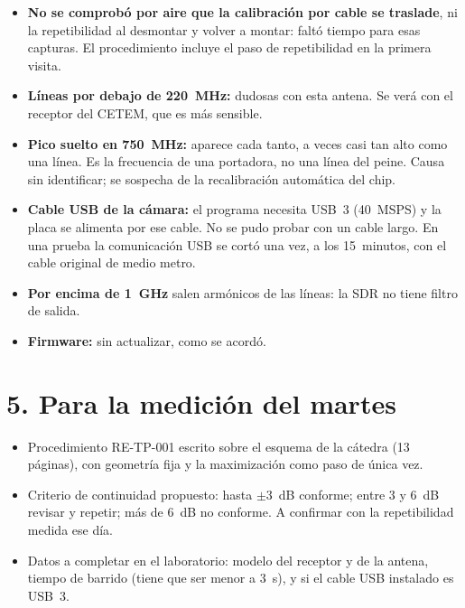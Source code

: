 \documentclass[11pt,a4paper]{article}
\begin{document}
\begin{itemize}
  \item \textbf{No se comprobó por aire que la calibración por cable se traslade}, ni la repetibilidad al desmontar y volver a montar: faltó tiempo para esas capturas. El procedimiento incluye el paso de repetibilidad en la primera visita.
  \item \textbf{Líneas por debajo de 220~MHz:} dudosas con esta antena. Se verá con el receptor del CETEM, que es más sensible.
  \item \textbf{Pico suelto en 750~MHz:} aparece cada tanto, a veces casi tan alto como una línea. Es la frecuencia de una portadora, no una línea del peine. Causa sin identificar; se sospecha de la recalibración automática del chip.
  \item \textbf{Cable USB de la cámara:} el programa necesita USB~3 (40~MSPS) y la placa se alimenta por ese cable. No se pudo probar con un cable largo. En una prueba la comunicación USB se cortó una vez, a los 15~minutos, con el cable original de medio metro.
  \item \textbf{Por encima de 1~GHz} salen armónicos de las líneas: la SDR no tiene filtro de salida.
  \item \textbf{Firmware:} sin actualizar, como se acordó.
\end{itemize}

\section*{5. Para la medición del martes}

\begin{itemize}
  \item Procedimiento RE-TP-001 escrito sobre el esquema de la cátedra (13 páginas), con geometría fija y la maximización como paso de única vez.
  \item Criterio de continuidad propuesto: hasta $\pm$3~dB conforme; entre 3 y 6~dB revisar y repetir; más de 6~dB no conforme. A confirmar con la repetibilidad medida ese día.
  \item Datos a completar en el laboratorio: modelo del receptor y de la antena, tiempo de barrido (tiene que ser menor a 3~s), y si el cable USB instalado es USB~3.
\end{itemize}
\end{document}

